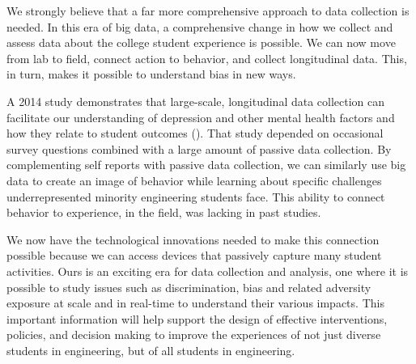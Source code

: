 

We strongly believe that a far more comprehensive approach to data collection is needed. In this era of big data, a comprehensive change in how we collect and assess data about the college student experience is possible. We can now move from lab to field, connect action to behavior, and collect longitudinal data. This, in turn, makes it possible to understand bias in  new ways.  

A 2014 study demonstrates that large-scale, longitudinal data collection can facilitate our understanding of depression and other mental health factors and how they relate to student outcomes (\eg \cite{wang2014studentlife}). That study depended on occasional survey questions combined with a large amount of passive data collection. By complementing self reports with passive data collection, we can similarly use big data to create an image of behavior while learning about specific challenges underrepresented minority engineering students face. This ability to connect behavior to experience, in the field, was lacking in past studies.  %

We now have the technological innovations needed to make this connection possible because we can access devices that passively capture many student activities. %
Ours is an exciting era for data collection and analysis, one where it is possible to study issues such as discrimination, bias and related adversity exposure at scale and in real-time to understand their various impacts. This important information will help support the design of effective interventions, policies, and decision making to improve the experiences of not just diverse students in engineering, but of all students in engineering. 
 
